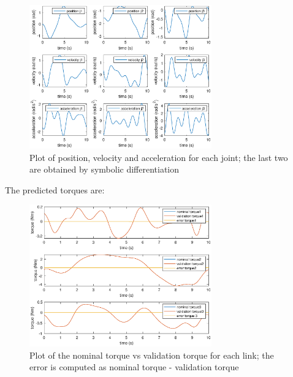 \documentclass{article}
\begin{document}
\begin{figure}[!htbp]
\centering
\includegraphics[width=0.7\textwidth]{images/3-dof/validation_trajectory.eps}
\caption{Plot of position, velocity and acceleration for each joint; the last two are obtained by symbolic differentiation}
\end{figure}
\FloatBarrier

The predicted torques are:

\begin{figure}[!htbp]
\centering
\includegraphics[width=0.7\textwidth]{images/3-dof/validation.eps}
\caption{Plot of the nominal torque vs validation torque for each link; the error is computed as nominal torque - validation torque}
\end{figure}
\FloatBarrier

\pagebreak
\end{document}

